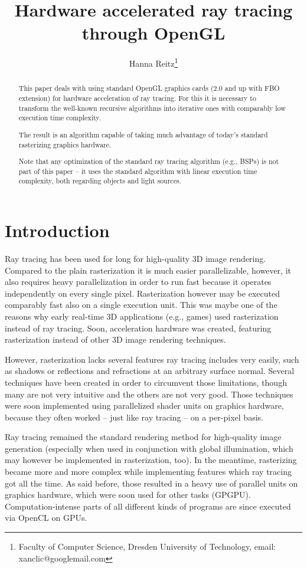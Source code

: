 \documentclass[english,fleqn,10pt,twocolumn]{article}
\date{}
\title{Hardware accelerated ray tracing through OpenGL}
\author{Hanna Reitz\thanks{Faculty of Computer Science, Dresden University of Technology, email: xanclic@googlemail.com}}
\begin{document}
\maketitle

\begin{abstract}
    This paper deals with using standard OpenGL graphics cards (2.0 and up with FBO extension) for hardware acceleration of ray tracing. For this it is necessary to transform the well-known recursive algorithms into iterative ones with
    comparably low execution time complexity. \par
    The result is an algorithm capable of taking much advantage of today's standard rasterizing graphics hardware. \par
    Note that any optimization of the standard ray tracing algorithm (e.g., BSPs) is not part of this paper -- it uses the standard algorithm with linear execution time complexity, both regarding objects and light sources.
\end{abstract}


\section{Introduction}

Ray tracing has been used for long for high-quality 3D image rendering. Compared to the plain rasterization it is much easier parallelizable, however, it also requires heavy parallelization in order to run fast because it operates
independently on every single pixel. Rasterization however may be executed comparably fast also on a single execution unit. This was maybe one of the reasons why early real-time 3D applications (e.g., games) used rasterization instead
of ray tracing. Soon, acceleration hardware was created, featuring rasterization instead of other 3D image rendering techniques.

However, rasterization lacks several features ray tracing includes very easily, such as shadows or reflections and refractions at an arbitrary surface normal. Several techniques have been created in order to circumvent those limitations,
though many are not very intuitive and the others are not very good. Those techniques were soon implemented using parallelized shader units on graphics hardware, because they often worked -- just like ray tracing -- on a per-pixel basis.

Ray tracing remained the standard rendering method for high-quality image generation (especially when used in conjunction with global illumination, which may however be implemented in rasterization, too). In the meantime, rasterizing
became more and more complex while implementing features which ray tracing got all the time. As said before, those resulted in a heavy use of parallel units on graphics hardware, which were soon used for other tasks (GPGPU).
Computation-intense parts of all different kinds of programs are since executed via OpenCL on GPUs.
\end{document}
